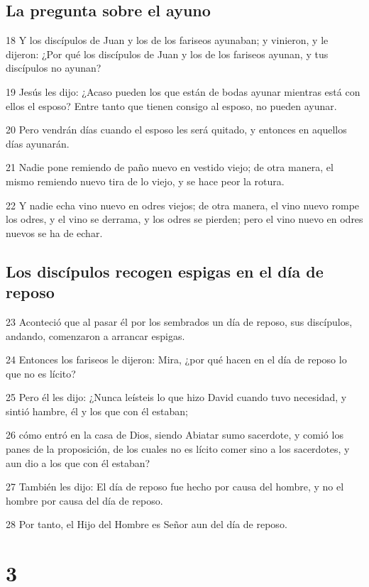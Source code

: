 \section*{La pregunta sobre el ayuno}

\par 18 Y los discípulos de Juan y los de los fariseos ayunaban; y vinieron, y le dijeron: ¿Por qué los discípulos de Juan y los de los fariseos ayunan, y tus discípulos no ayunan?
\par 19 Jesús les dijo: ¿Acaso pueden los que están de bodas ayunar mientras está con ellos el esposo? Entre tanto que tienen consigo al esposo, no pueden ayunar.
\par 20 Pero vendrán días cuando el esposo les será quitado, y entonces en aquellos días ayunarán.
\par 21 Nadie pone remiendo de paño nuevo en vestido viejo; de otra manera, el mismo remiendo nuevo tira de lo viejo, y se hace peor la rotura.
\par 22 Y nadie echa vino nuevo en odres viejos; de otra manera, el vino nuevo rompe los odres, y el vino se derrama, y los odres se pierden; pero el vino nuevo en odres nuevos se ha de echar.

\section*{Los discípulos recogen espigas en el día de reposo}

\par 23 Aconteció que al pasar él por los sembrados un día de reposo, sus discípulos, andando, comenzaron a arrancar espigas.
\par 24 Entonces los fariseos le dijeron: Mira, ¿por qué hacen en el día de reposo lo que no es lícito?
\par 25 Pero él les dijo: ¿Nunca leísteis lo que hizo David cuando tuvo necesidad, y sintió hambre, él y los que con él estaban;
\par 26 cómo entró en la casa de Dios, siendo Abiatar sumo sacerdote, y comió los panes de la proposición, de los cuales no es lícito comer sino a los sacerdotes, y aun dio a los que con él estaban?
\par 27 También les dijo: El día de reposo fue hecho por causa del hombre, y no el hombre por causa del día de reposo.
\par 28 Por tanto, el Hijo del Hombre es Señor aun del día de reposo.

\chapter{3}

